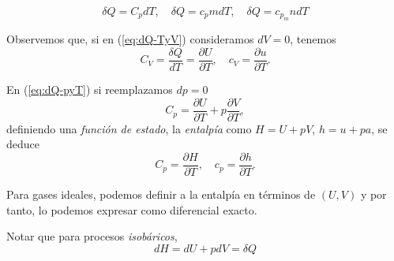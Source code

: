 \documentclass[openany]{book}
\begin{document}
\begin{equation}\label{eq:dQ-cp}
	\delta Q=C_pdT,\quad\delta Q=c_pmdT,\quad\delta Q=c_{p_m}ndT
\end{equation}
\par Observemos que, si en (\ref{eq:dQ-TyV}) consideramos $dV=0$, tenemos
\begin{equation*}
	C_V=\frac{\delta Q}{dT}=\frac{\partial U}{\partial T},\quad c_V=\frac{\partial u}{\partial T}.
\end{equation*}
\par En (\ref{eq:dQ-pyT}) si reemplazamos $dp=0$
\begin{equation*}
	C_p=\frac{\partial U}{\partial T}+p\frac{\partial V}{\partial T},
\end{equation*}
definiendo una \emph{función de estado}, la \emph{entalpía} como $H=U+pV$, $h=u+pa$, se deduce
\begin{equation*}
	C_p=\frac{\partial H}{\partial T},\quad c_p=\frac{\partial h}{\partial T}.
\end{equation*}
\par Para gases ideales, podemos definir a la entalpía en términos de $(U,V)$ y por tanto, lo podemos expresar como diferencial exacto.
\par Notar que para procesos \emph{isobáricos},
\begin{equation*}
	dH=dU+pdV=\delta Q
\end{equation*}
\end{document}
